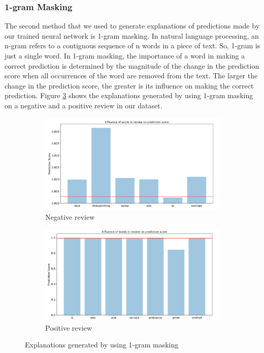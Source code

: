 \documentclass[11pt]{article}
\begin{document}
\subsubsection{1-gram Masking}

The second method that we used to generate explanations of predictions made by our trained neural network is 1-gram masking. In natural language processing, an n-gram refers to a contiguous sequence of n words in a piece of text. So, 1-gram is just a single word. In 1-gram masking, the importance of a word in making a correct prediction is determined by the magnitude of the change in the prediction score when all occurrences of the word are removed from the text. The larger the change in the prediction score, the greater is its influence on making the correct prediction. Figure \ref{fig:mask} shows the explanations generated by using 1-gram masking on a negative and a positive review in our dataset.

\begin{figure}
	\centering
	\begin{subfigure}{0.45\textwidth}
		\centering
		\includegraphics[width=\linewidth]{figure5}
		\caption{Negative review}
		\label{fig:mask:neg}
	\end{subfigure} %
	\begin{subfigure}{0.45\textwidth}
		\centering
		\includegraphics[width=\linewidth]{figure4}
		\caption{Positive review}
		\label{fig:mask:pos}
	\end{subfigure}
	\caption{Explanations generated by using 1-gram masking}
	\label{fig:mask}
\end{figure}
\end{document}
